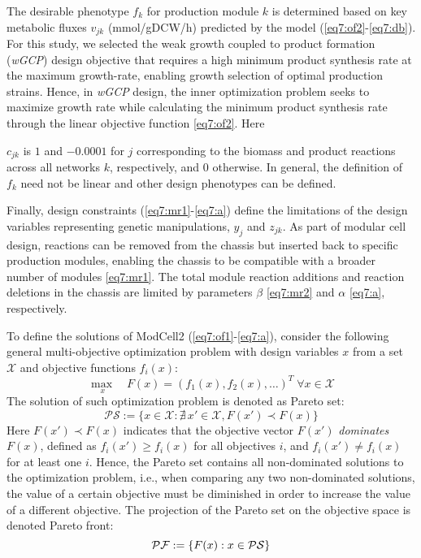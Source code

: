 The desirable phenotype $f_k$ for production module $k$ is determined based on key metabolic fluxes $v_{jk}$ (mmol/gDCW/h) predicted by the model (\ref{eq7:of2}-\ref{eq7:db}).
For this study, we selected the weak growth coupled to product formation (\emph{wGCP}) design objective that requires a high minimum product synthesis rate at the maximum growth-rate, enabling growth selection of optimal production strains.
Hence, in \emph{wGCP} design, the inner optimization problem seeks to maximize growth rate while calculating the minimum product synthesis rate through the linear objective function \eqref{eq7:of2}. Here {$c_{jk}$ is $1$ and $-0.0001$ for $j$ corresponding to the biomass and product reactions across all networks $k$, respectively, and 0 otherwise.
In general, the definition of $f_k$ need not be linear and other design phenotypes can be defined.\citep{garcia2019}

Finally, design constraints (\ref{eq7:mr1}-\ref{eq7:a}) define the limitations of the design variables representing genetic manipulations, $y_j$ and $z_{jk}$.
As part of modular cell design, reactions can be removed from the chassis but inserted back to specific production modules, enabling the chassis to be compatible with a broader number of modules \eqref{eq7:mr1}.
The total module reaction additions and reaction deletions in the chassis are limited by parameters $\beta$ \eqref{eq7:mr2} and $\alpha$ \eqref{eq7:a}, respectively.%

To define the solutions of ModCell2 (\ref{eq7:of1}-\ref{eq7:a}), consider the following general multi-objective optimization problem with design variables $x$ from a set $\mathcal{X}$ and objective functions $f_i(x)$:
\begin{equation*}
    \underset{ \;x}{\max} \quad F(x) = (f_1(x), f_2(x), \ldots)^T \; \forall x \in \mathcal{X}
\end{equation*}
The solution of such optimization problem is denoted as Pareto set:
\begin{equation*}
    \mathcal{PS}:=\{x \in \mathcal{X}:\nexists \, x' \in \mathcal{X}, F(x') \prec F(x)\} \label{eq7:ps}
\end{equation*}
Here $F(x') \prec F(x)$ indicates that the objective vector $F(x')$ \emph{dominates} $F(x)$, defined as $f_i(x') \ge f_i(x)$ for all objectives $i$, and $f_i(x') \ne f_i(x)$ for at least one $i$. Hence, the Pareto set contains all non-dominated solutions to the optimization problem, i.e., when comparing any two non-dominated solutions, the value of a certain objective must be diminished in order to increase the value of a different objective. The projection of the Pareto set on the objective space is denoted Pareto front:
\begin{equation*}
    \mathcal{PF}:=\{F(x): x \in \mathcal{PS} \}
\end{equation*}

}
